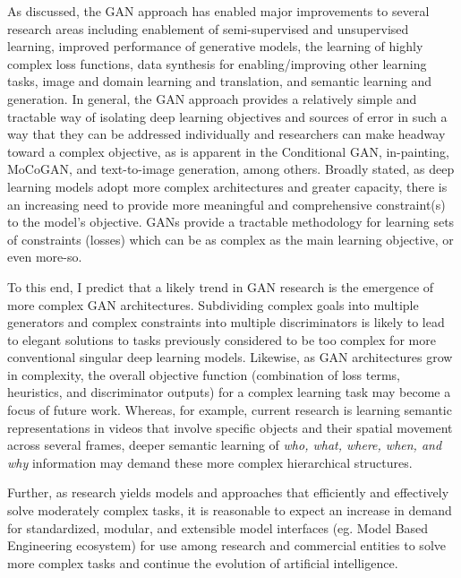 \documentclass[11pt]{article}
\begin{document}
As discussed, the GAN approach has enabled major improvements to several research areas including enablement of semi-supervised and unsupervised learning, improved performance of generative models, the learning of highly complex loss functions, data synthesis for enabling/improving other learning tasks, image and domain learning and translation, and semantic learning and generation.  In general, the GAN approach provides a relatively simple and tractable way of isolating deep learning objectives and sources of error in such a way that they can be addressed individually and researchers can make headway toward a complex objective, as is apparent in the Conditional GAN, in-painting, MoCoGAN, and text-to-image generation, among others.  Broadly stated, as deep learning models adopt more complex architectures and greater capacity, there is an increasing need to provide more meaningful and comprehensive constraint(s) to the model's objective.  GANs provide a tractable methodology for learning sets of constraints (losses) which can be as complex as the main learning objective, or even more-so.

To this end, I predict that a likely trend in GAN research is the emergence of more complex GAN architectures.  Subdividing complex goals into multiple generators and complex constraints into multiple discriminators is likely to lead to elegant solutions to tasks previously considered to be too complex for more conventional singular deep learning models.  Likewise, as GAN architectures grow in complexity, the overall objective function (combination of loss terms, heuristics, and discriminator outputs) for a complex learning task may become a focus of future work.  Whereas, for example, current research is learning semantic representations in videos that involve specific objects and their spatial movement across several frames, deeper semantic learning of \textit{who, what, where, when, and why} information may demand these more complex hierarchical structures.

Further, as research yields models and approaches that efficiently and effectively solve moderately complex tasks, it is reasonable to expect an increase in demand for standardized, modular, and extensible model interfaces (eg. Model Based Engineering ecosystem) for use among research and commercial entities to solve more complex tasks and continue the evolution of artificial intelligence.
\end{document}
